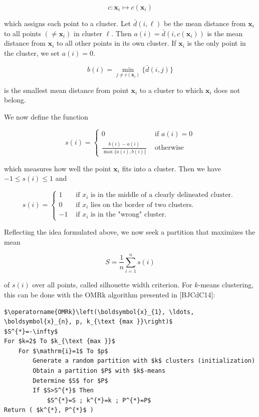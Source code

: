 \documentclass[10pt]{article}
\begin{document}
$$
c: \boldsymbol{x}_{i} \mapsto c\left(\boldsymbol{x}_{i}\right)
$$

which assigns each point to a cluster. Let $\bar{d}(i, \ell)$ be the mean distance from $\boldsymbol{x}_{i}$ to all points $\left(\neq \boldsymbol{x}_{i}\right)$ in cluster $\ell$. Then $a(i)=\bar{d}\left(i, c\left(\boldsymbol{x}_{i}\right)\right)$ is the mean distance from $\boldsymbol{x}_{i}$ to all other points in its own cluster. If $\boldsymbol{x}_{i}$ is the only point in the cluster, we set $a(i)=0$.

$$
b(i)=\min _{j \neq c\left(\boldsymbol{x}_{i}\right)}\{\bar{d}(i, j)\}
$$

is the smallest mean distance from point $\boldsymbol{x}_{i}$ to a cluster to which $\boldsymbol{x}_{i}$ does not belong.

We now define the function

$$
s(i)=\left\{\begin{array}{cc}
0 & \text { if } a(i)=0 \\
\frac{b(i)-a(i)}{\max \{a(i), b(i)\}} & \text { otherwise }
\end{array}\right.
$$

which measures how well the point $\boldsymbol{x}_{i}$ fits into a cluster. Then we have $-1 \leq s(i) \leq 1$ and

$$
s(i)= \begin{cases}1 & \text { if } x_{i} \text { is in the middle of a clearly delineated cluster. } \\ 0 & \text { if } x_{i} \text { lies on the border of two clusters. } \\ -1 & \text { if } x_{i} \text { is in the "wrong" cluster. }\end{cases}
$$

Reflecting the idea formulated above, we now seek a partition that maximizes the mean

$$
S=\frac{1}{n} \sum_{i=1}^{n} s(i)
$$

of $s(i)$ over all points, called silhouette width criterion. For $k$-means clustering, this can be done with the OMRk algorithm presented in [BJCdC14]:

\begin{verbatim}
$\operatorname{OMRk}\left(\boldsymbol{x}_{1}, \ldots, \boldsymbol{x}_{n}, p, k_{\text {max }}\right)$
$S^{*}=-\infty$
For $k=2$ To $k_{\text {max }}$
    For $\mathrm{i}=1$ To $p$
        Generate a random partition with $k$ clusters (initialization)
        Obtain a partition $P$ with $k$-means
        Determine $S$ for $P$
        If $S>S^{*}$ Then
            $S^{*}=S ; k^{*}=k ; P^{*}=P$
Return ( $k^{*}, P^{*}$ )
\end{verbatim}
\end{document}
